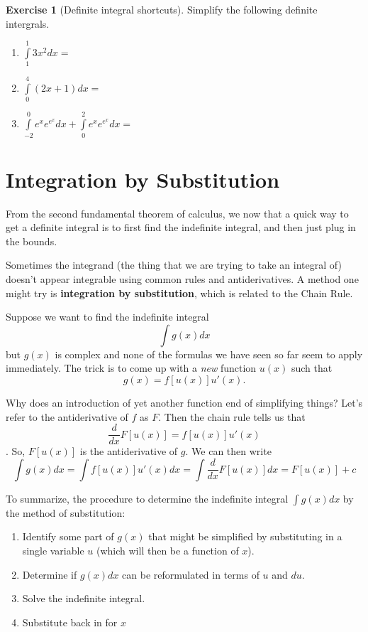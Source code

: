 \documentclass[
]{book}
\providecommand{\tightlist}{%
  \setlength{\itemsep}{0pt}\setlength{\parskip}{0pt}}
\theoremstyle{definition}
\theoremstyle{definition}
\theoremstyle{definition}
\newtheorem{exercise}{Exercise}[chapter]
\theoremstyle{remark}
\begin{document}
\begin{exercise}[Definite integral shortcuts]
\protect\hypertarget{exr:unnamed-chunk-30}{}{\label{exr:unnamed-chunk-30} {} }Simplify the following definite intergrals.

\begin{enumerate}
\def\labelenumi{\arabic{enumi}.}
\tightlist
\item
  \(\int\limits_1^1 3x^2 dx =\)
\item
  \(\int\limits_0^4 (2x+1)dx=\)
\item
  \(\int\limits_{-2}^0 e^x e^{e^x} dx + \int\limits_0^2 e^x e^{e^x} dx =\)
\end{enumerate}
\end{exercise}

\hypertarget{integration-by-substitution}{%
\section{Integration by Substitution}\label{integration-by-substitution}}

From the second fundamental theorem of calculus, we now that a quick way to get a definite integral is to first find the indefinite integral, and then just plug in the bounds.

Sometimes the integrand (the thing that we are trying to take an integral of) doesn't appear integrable using common rules and antiderivatives. A method one might try is \textbf{integration by substitution}, which is related to the Chain Rule.

Suppose we want to find the indefinite integral \[\int g(x)dx\] but \(g(x)\) is complex and none of the formulas we have seen so far seem to apply immediately. The trick is to come up with a \emph{new} function \(u(x)\) such that \[g(x)=f[u(x)]u'(x).\]

Why does an introduction of yet another function end of simplifying things? Let's refer to the antiderivative of \(f\) as \(F\). Then the chain rule tells us that \[\frac{d}{dx} F[u(x)]=f[u(x)]u'(x)\]. So, \(F[u(x)]\) is the antiderivative of \(g\). We can then write \[\int g(x) dx= \int f[u(x)]u'(x)dx = \int \frac{d}{dx} F[u(x)]dx = F[u(x)]+c\]

To summarize, the procedure to determine the indefinite integral \(\int g(x)dx\) by the method of substitution:

\begin{enumerate}
\def\labelenumi{\arabic{enumi}.}
\tightlist
\item
  Identify some part of \(g(x)\) that might be simplified by substituting in a single variable \(u\) (which will then be a function of \(x\)).
\item
  Determine if \(g(x)dx\) can be reformulated in terms of \(u\) and \(du\).
\item
  Solve the indefinite integral.
\item
  Substitute back in for \(x\)
\end{enumerate}
\end{document}
